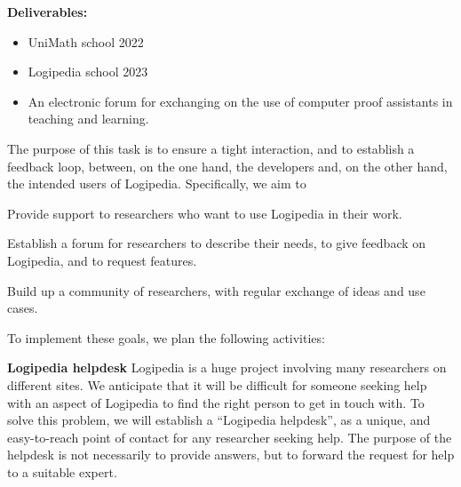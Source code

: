 \begin{workpackage}[id=dissemination,wphases=0-48,type=MGT,
  short=Dissemination,%
  title={Dissemination, communication and exploitation},
  lead=Inr]
\begin{tasklist}
\begin{task}[id=training,
      title=Training Logipedia developers and users,
      lead=Inr,InrRM=2,IrtRM=2]
    \textbf{Deliverables:}
    \begin{itemize}
     \item UniMath school 2022
     \item Logipedia school 2023
     \item An electronic forum for exchanging on the use of computer proof assistants in teaching and learning.
    \end{itemize}

    
  \end{task}

  \begin{task}[id=research-club,
      title=Expanding the use of Logipedia in research,
      lead=Bir,BirRM=2]
    The purpose of this task is to ensure a tight interaction, and to establish a feedback loop, between, on the one hand, the developers and, on the other hand, the intended users of Logipedia.
    Specifically, we aim to 
    \begin{compactenum}
     \item Provide support to researchers who want to use Logipedia in their work.
     \item Establish a forum for researchers to describe their needs, to give feedback on Logipedia, and to request features.
     \item Build up a community of researchers, with regular exchange of ideas and use cases.
    \end{compactenum}
    To implement these goals, we plan the following activities:
    \begin{compactenum}
     \item [\textbf{Logipedia helpdesk}] 
     Logipedia is a huge project involving many researchers on different sites. We anticipate that it will be difficult for someone seeking help with an aspect of Logipedia to find the right person to get in touch with.
     To solve this problem, we will establish a ``Logipedia helpdesk'', as a unique, and easy-to-reach point of contact for any researcher seeking help.
     The purpose of the helpdesk is not necessarily to provide answers, but to forward the request for help to a suitable expert.
     

\end{compactenum}
\end{task}
\end{tasklist}
\end{workpackage}

